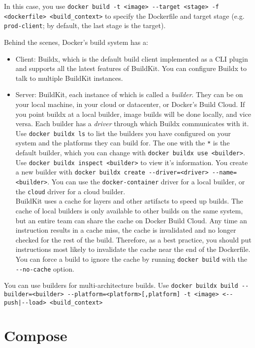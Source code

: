 \documentclass[8pt, table, xcdraw]{article}%
\begin{document}
In this case, you use \lstinline{docker build -t <image> --target <stage> -f <dockerfile> <build_context>} to specify the Dockerfile and target stage (e.g. \lstinline{prod-client}; by default, the last stage is the target).

Behind the scenes, Docker’s build system has a:

\begin{itemize}
    \item Client: Buildx, which is the default build client implemented as a CLI plugin and supports all the latest features of BuildKit. You can configure Buildx to talk to multiple BuildKit instances.
    \item Server: BuildKit, each instance of which is called a \emph{builder}. They can be on your local machine, in your cloud or datacenter, or Docker’s Build Cloud. If you point buildx at a local builder, image builds will be done locally, and vice versa. Each builder has a \emph{driver} through which Buildx communicates with it. Use \lstinline{docker buildx ls} to list the builders you have configured on your system and the platforms they can build for. The one with the \lstinline{*} is the default builder, which you can change with \lstinline{docker buildx use <builder>}. Use \lstinline{docker buildx inspect <builder>} to view it's information. You create a new builder with \lstinline{docker buildx create --driver=<driver> --name=<builder>}. You can use the \lstinline{docker-container} driver for a local builder, or the \lstinline{cloud} driver for a cloud builder.\\
    BuildKit uses a cache for layers and other artifacts to speed up builds. The cache of local builders is only available to other builds on the same system, but an entire team can share the cache on Docker Build Cloud. Any time an instruction results in a cache miss, the cache is invalidated and no longer checked for the rest of the build. Therefore, as a best practice, you should put instructions most likely to invalidate the cache near the end of the Dockerfile. You can force a build to ignore the cache by running \lstinline{docker build} with the \lstinline{--no-cache} option.
\end{itemize}

You can use builders for multi-architecture builds. Use \lstinline{docker buildx build --builder=<builder> --platform=<platform>[,platform] -t <image> <--push|--load> <build_context>}

\section{Compose}
\end{document}
